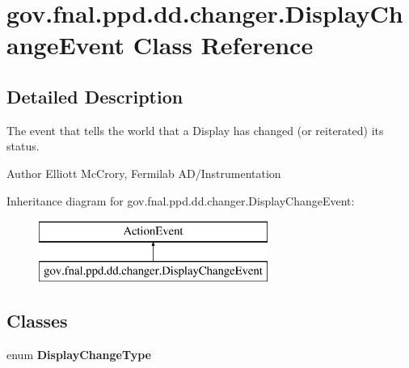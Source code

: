\hypertarget{classgov_1_1fnal_1_1ppd_1_1dd_1_1changer_1_1DisplayChangeEvent}{\section{gov.\-fnal.\-ppd.\-dd.\-changer.\-Display\-Change\-Event Class Reference}
\label{classgov_1_1fnal_1_1ppd_1_1dd_1_1changer_1_1DisplayChangeEvent}
}


\subsection{Detailed Description}
The event that tells the world that a Display has changed (or reiterated) its status.

\begin{DoxyAuthor}{Author}
Elliott Mc\-Crory, Fermilab A\-D/\-Instrumentation 
\end{DoxyAuthor}
Inheritance diagram for gov.\-fnal.\-ppd.\-dd.\-changer.\-Display\-Change\-Event\-:\begin{figure}[H]
\begin{center}
\leavevmode
\includegraphics[height=2.000000cm]{classgov_1_1fnal_1_1ppd_1_1dd_1_1changer_1_1DisplayChangeEvent}
\end{center}
\end{figure}
\subsection*{Classes}
\begin{DoxyCompactItemize}
\item 
enum {\bfseries Display\-Change\-Type}
\end{DoxyCompactItemize}

